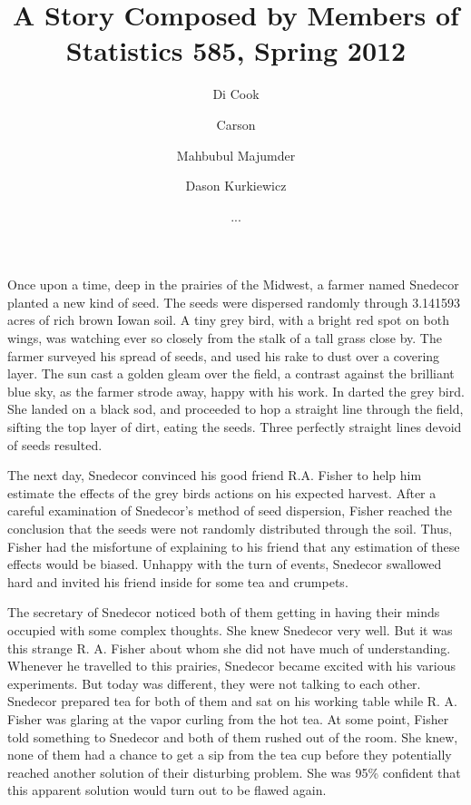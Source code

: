 \documentclass{article}
\begin{document}
\title{A Story Composed by Members of Statistics 585, Spring 2012}
\author{Di Cook \and Carson \and Mahbubul Majumder \and Dason Kurkiewicz \and ...}
\maketitle

Once upon a time, deep in the prairies of the Midwest, a farmer named Snedecor planted a new kind of seed. The seeds were dispersed randomly through 3.141593 acres of rich brown Iowan soil. A tiny grey bird, with a bright red spot on both wings, was watching ever so closely  from the stalk of a tall grass close by. The farmer surveyed his spread of seeds, and used his rake to dust  over a covering layer. The sun cast a golden gleam over the field, a contrast against the brilliant blue sky, as the farmer strode away, happy with his work. In darted the grey bird. She landed on a black sod, and proceeded to hop a straight line through the field, sifting the top layer of dirt, eating the seeds. Three perfectly straight lines devoid of seeds resulted. 

The next day, Snedecor convinced his good friend R.A. Fisher to help him estimate the effects of the grey birds actions on his expected harvest. After a careful examination of Snedecor's method of seed dispersion, Fisher reached the conclusion that the seeds were not randomly distributed through the soil. Thus, Fisher had the misfortune of explaining to his friend that any estimation of these effects would be biased. Unhappy with the turn of events, Snedecor swallowed hard and invited his friend inside for some tea and crumpets.

The secretary of Snedecor  noticed both of them getting in having their minds occupied with some complex thoughts. She knew Snedecor very well. But it was this strange R. A. Fisher about whom she did not have much of understanding. Whenever he travelled to this prairies, Snedecor became excited with his various experiments. But today was different, they were not talking to each other. Snedecor prepared tea for both of them and sat on his working table while R. A. Fisher was glaring at the vapor curling from the hot tea. At some point, Fisher told something to Snedecor and both of them rushed out of the room. She knew, none of them had a chance to get a sip from the tea cup before they potentially reached another solution of their disturbing problem. She was 95\% confident that this apparent solution would turn out to be flawed again. 
\end{document}
